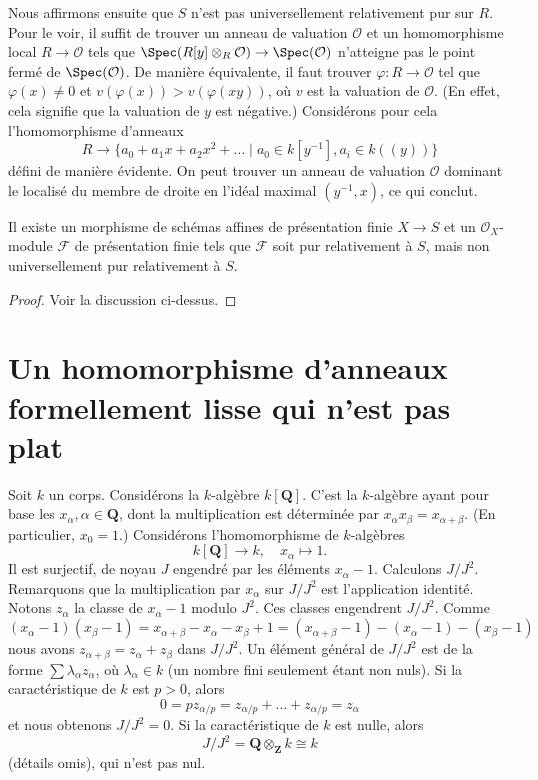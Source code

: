 \medskip\noindent
Nous affirmons ensuite que $S$ n'est pas universellement relativement pur sur $R$.
Pour le voir, il suffit de trouver un anneau de valuation
$\mathcal{O}$ et un homomorphisme local $R \to \mathcal{O}$ tels que
$\Spec(R[y] \otimes_R \mathcal{O}) \to \Spec(\mathcal{O})$
n'atteigne pas le point fermé de $\Spec(\mathcal{O})$.
De manière équivalente, il faut trouver $\varphi : R \to \mathcal{O}$ tel que
$\varphi(x) \not = 0$ et $v(\varphi(x)) > v(\varphi(xy))$, où $v$
est la valuation de $\mathcal{O}$.
(En effet, cela signifie que la valuation de $y$ est négative.)
Considérons pour cela l'homomorphisme d'anneaux
$$
R
\longrightarrow
\{a_0 + a_1 x + a_2 x^2 + \ldots \mid a_0 \in k[y^{-1}], a_i \in k((y))\}
$$
défini de manière évidente. On peut trouver un anneau de valuation $\mathcal{O}$
dominant le localisé du membre de droite en l'idéal
maximal $(y^{-1}, x)$, ce qui conclut.

\begin{lemma}
\label{lemma-pure-not-universally-pure}
Il existe un morphisme de schémas affines de présentation finie
$X \to S$ et un $\mathcal{O}_X$-module $\mathcal{F}$ de présentation finie
tels que $\mathcal{F}$ soit pur relativement à $S$, mais non universellement
pur relativement à $S$.
\end{lemma}

\begin{proof}
Voir la discussion ci-dessus.
\end{proof}



\section[Homomorphisme formellement lisse non plat]{Un homomorphisme d'anneaux formellement lisse qui n'est pas plat}
\label{section-formally-smooth-nonflat}

\noindent
Soit $k$ un corps. Considérons la $k$-algèbre $k[\mathbf{Q}]$.
C'est la $k$-algèbre ayant pour base les $x_\alpha, \alpha \in \mathbf{Q}$,
dont la multiplication est déterminée par $x_\alpha x_\beta = x_{\alpha + \beta}$.
(En particulier, $x_0 = 1$.)
Considérons l'homomorphisme de $k$-algèbres
$$
k[\mathbf{Q}] \longrightarrow k, \quad
x_\alpha \longmapsto 1.
$$
Il est surjectif, de noyau $J$ engendré par les éléments $x_\alpha - 1$.
Calculons $J/J^2$. Remarquons que la multiplication par $x_\alpha$ sur $J/J^2$
est l'application identité. Notons $z_\alpha$ la classe de $x_\alpha - 1$ modulo
$J^2$. Ces classes engendrent $J/J^2$. Comme
$$
(x_\alpha - 1)(x_\beta - 1) = x_{\alpha + \beta} - x_\alpha - x_\beta + 1 =
(x_{\alpha + \beta} - 1) - (x_\alpha - 1) - (x_\beta - 1)
$$
nous avons $z_{\alpha + \beta} = z_\alpha + z_\beta$ dans $J/J^2$.
Un élément général de $J/J^2$ est de la forme $\sum \lambda_\alpha z_\alpha$,
où $\lambda_\alpha \in k$ (un nombre fini seulement étant non nuls). Si la
caractéristique de $k$ est $p > 0$, alors
$$
0 = pz_{\alpha/p} = z_{\alpha/p} + \ldots + z_{\alpha/p} = z_\alpha
$$
et nous obtenons $J/J^2 = 0$. Si la caractéristique de $k$ est nulle, alors
$$
J/J^2 = \mathbf{Q} \otimes_{\mathbf{Z}} k \cong k
$$
(détails omis), qui n'est pas nul.

